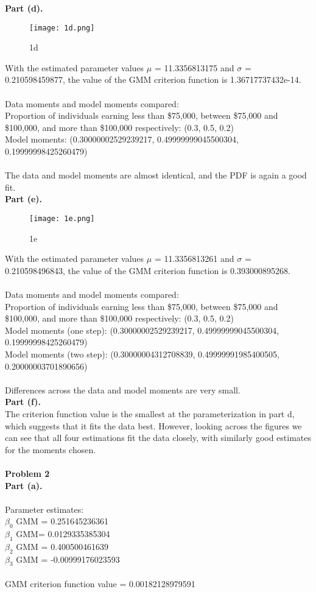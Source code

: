 \documentclass[letterpaper,12pt]{article}
\theoremstyle{definition}
\begin{document}
\noindent\textbf {Part (d).} \\

\begin{figure}[h!]
  \texttt{[image: 1d.png]}
  \caption{1d}
\end{figure}

\noindent
With the estimated parameter values $\mu$ = 11.3356813175 and $\sigma$ = 0.210598459877, the value of the GMM criterion function is 1.36717737432e-14.\\\\
Data moments and model moments compared:\\
Proportion of individuals earning less than \$75,000, between \$75,000 and \$100,000, and more than \$100,000 respectively: (0.3, 0.5, 0.2)\\
Model moments: (0.30000002529239217, 0.49999999045500304, 0.19999998425260479)\\\\
The data and model moments are almost identical, and the PDF is again a good fit.\\

\noindent
\textbf {Part (e).} \\

\begin{figure}[h!]
  \texttt{[image: 1e.png]}
  \caption{1e}
\end{figure}

\noindent
With the estimated parameter values $\mu$ = 11.3356813261 and $\sigma$ = 0.210598496843, the value of the GMM criterion function is 0.393000895268.\\\\
Data moments and model moments compared:\\
Proportion of individuals earning less than \$75,000, between \$75,000 and \$100,000, and more than \$100,000 respectively: (0.3, 0.5, 0.2)\\
Model moments (one step): (0.30000002529239217, 0.49999999045500304, 0.19999998425260479)\\
Model moments (two step): (0.30000004312708839, 0.49999991985400505, 0.20000003701890656)\\\\
Differences across the data and model moments are very small.\\

\noindent
\textbf {Part (f).} \\

\noindent
The criterion function value is the smallest at the parameterization in part d, which suggests that it fits the data best. However, looking across the figures we can see that all four estimations fit the data closely, with similarly good estimates for the moments chosen. \\\\

\noindent\textbf{Problem 2} \\
\textbf {Part (a).} \\\\
\noindent
Parameter estimates:\\
$\beta_0$ GMM = 0.251645236361\\
$\beta_1$ GMM= 0.0129335385304\\
$\beta_2$ GMM = 0.400500461639\\
$\beta_3$ GMM = -0.00999176023593\\\\
GMM criterion function value = 0.00182128979591
\end{document}
